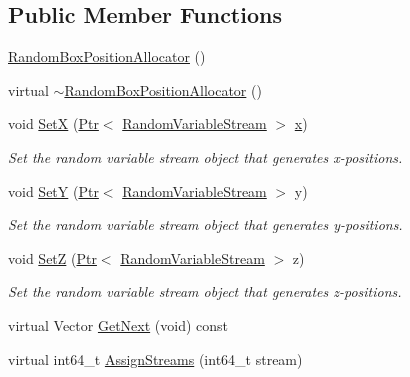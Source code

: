 \subsection*{Public Member Functions}
\begin{DoxyCompactItemize}
\item 
\hyperlink{classns3_1_1RandomBoxPositionAllocator_affca60ec5720808901930d03ac1600c5}{Random\+Box\+Position\+Allocator} ()
\item 
virtual \hyperlink{classns3_1_1RandomBoxPositionAllocator_aeec2ae939772df317ae4205b28ba0f24}{$\sim$\+Random\+Box\+Position\+Allocator} ()
\item 
void \hyperlink{classns3_1_1RandomBoxPositionAllocator_a57df64da849c14e6f5ac918d862a8141}{SetX} (\hyperlink{classns3_1_1Ptr}{Ptr}$<$ \hyperlink{classns3_1_1RandomVariableStream}{Random\+Variable\+Stream} $>$ \hyperlink{lte__link__budget__x2__handover__measures_8m_a9336ebf25087d91c818ee6e9ec29f8c1}{x})
\begin{DoxyCompactList}\small\item\em Set the random variable stream object that generates x-\/positions. \end{DoxyCompactList}\item 
void \hyperlink{classns3_1_1RandomBoxPositionAllocator_ade72483c608c4cb8c5d1d4fb01f800b7}{SetY} (\hyperlink{classns3_1_1Ptr}{Ptr}$<$ \hyperlink{classns3_1_1RandomVariableStream}{Random\+Variable\+Stream} $>$ y)
\begin{DoxyCompactList}\small\item\em Set the random variable stream object that generates y-\/positions. \end{DoxyCompactList}\item 
void \hyperlink{classns3_1_1RandomBoxPositionAllocator_a08dd0c836c57caa1e47d0b0d90cc9eb8}{SetZ} (\hyperlink{classns3_1_1Ptr}{Ptr}$<$ \hyperlink{classns3_1_1RandomVariableStream}{Random\+Variable\+Stream} $>$ z)
\begin{DoxyCompactList}\small\item\em Set the random variable stream object that generates z-\/positions. \end{DoxyCompactList}\item 
virtual Vector \hyperlink{classns3_1_1RandomBoxPositionAllocator_a91eb4a4d75233f0dac7001a00631608e}{Get\+Next} (void) const 
\item 
virtual int64\+\_\+t \hyperlink{classns3_1_1RandomBoxPositionAllocator_a0b82abf7e33a93051c9c8eff21e0a696}{Assign\+Streams} (int64\+\_\+t stream)
\end{DoxyCompactItemize}
